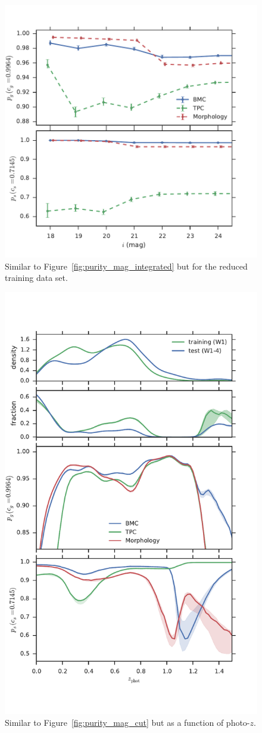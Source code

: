 \begin{figure}[htp]
  \centering
  \includegraphics[width=0.8\linewidth]{figures/purity_mag_cut_integrated.pdf}
  \caption{Similar to Figure~\ref{fig:purity_mag_integrated}
           but for the reduced training data set.}
  \label{fig:purity_mag_cut_integrated}
\end{figure}

\begin{figure}[htp]
  \centering
  \includegraphics[width=0.7\linewidth]{figures/purity_z_cut.pdf}
  \caption{Similar to Figure~\ref{fig:purity_mag_cut}
           but as a function of photo-$z$.}
  \label{fig:purity_z_cut}
\end{figure}

